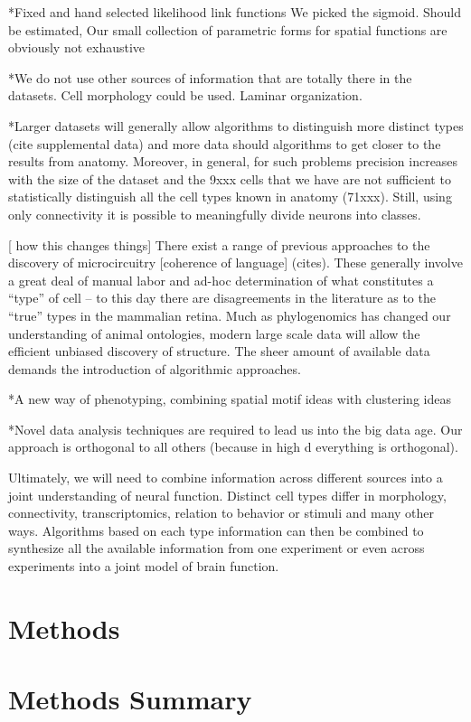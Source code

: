 \documentclass{article}
\begin{document}
*Fixed and hand selected likelihood link functions We picked the sigmoid. Should be estimated, Our small collection of parametric forms for spatial functions are obviously not exhaustive

*We do not use other sources of information that are totally there in the datasets. Cell morphology could be used. Laminar organization.

*Larger datasets will generally allow algorithms to distinguish more distinct types (cite supplemental data) and more data should algorithms to get closer to the results from anatomy. Moreover, in general, for such problems precision increases with the size of the dataset and the 9xxx cells that we have are not sufficient to statistically distinguish all the cell types known in anatomy (71xxx). Still, using only connectivity it is possible to meaningfully divide neurons into classes. 

[ how this changes things] There exist a range of previous approaches
to the discovery of microcircuitry [coherence of language]
(cites). These generally involve a great deal of manual labor and
ad-hoc determination of what constitutes a “type” of cell -- to this
day there are disagreements in the literature as to the “true” types
in the mammalian retina. Much as phylogenomics has changed our
understanding of animal ontologies, modern large scale data will allow
the efficient unbiased discovery of structure. The sheer amount of
available data demands the introduction of algorithmic approaches.


*A new way of phenotyping, combining spatial motif ideas with clustering ideas

*Novel data analysis techniques are required to lead us into the big data age. Our approach is orthogonal to all others (because in high d everything is orthogonal).

Ultimately, we will need to combine information across different sources into a joint understanding of neural function. Distinct cell types differ in morphology, connectivity, transcriptomics, relation to behavior or stimuli and many other ways. Algorithms based on each type information can then be combined to synthesize all the available information from one experiment or even across experiments into a joint model of brain function.


\section{Methods}
\section{Methods Summary}
\end{document}
